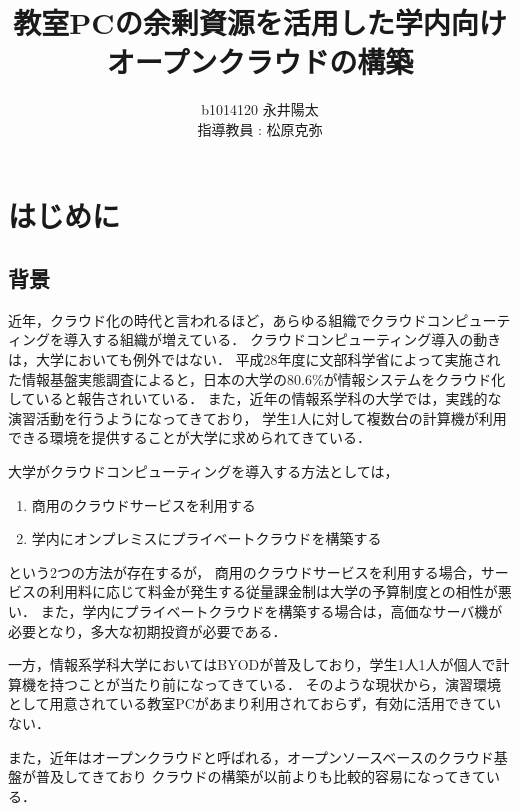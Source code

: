 \documentclass[11pt,a4paper]{jsarticle}
\author{%
b1014120 永井陽太\\指導教員 : 松原克弥
}
\title{教室PCの余剰資源を活用した学内向けオープンクラウドの構築}
\begin{document}
\maketitle

\section{はじめに}
\subsection{背景}
近年，クラウド化の時代と言われるほど，あらゆる組織でクラウドコンピューティングを導入する組織が増えている\cite{academiccloud}．
クラウドコンピューティング導入の動きは，大学においても例外ではない．
平成28年度に文部科学省によって実施された情報基盤実態調査によると，日本の大学の80.6\%が情報システムをクラウド化していると報告されいている\cite{SurveyOnActualStateOfAcademicInformationInfrastructure}．
また，近年の情報系学科の大学では，実践的な演習活動を行うようになってきており\cite{practicalict}，
学生1人に対して複数台の計算機が利用できる環境を提供することが大学に求められてきている．
\par 大学がクラウドコンピューティングを導入する方法としては，
\begin{enumerate}
	\item 商用のクラウドサービスを利用する
	\item 学内にオンプレミスにプライベートクラウドを構築する
\end{enumerate}
という2つの方法が存在するが，
商用のクラウドサービスを利用する場合，サービスの利用料に応じて料金が発生する従量課金制は大学の予算制度との相性が悪い．
また，学内にプライベートクラウドを構築する場合は，高価なサーバ機が必要となり，多大な初期投資が必要である．
\par 一方，情報系学科大学においてはBYODが普及しており，学生1人1人が個人で計算機を持つことが当たり前になってきている．
そのような現状から，演習環境として用意されている教室PCがあまり利用されておらず，有効に活用できていない．
\par また，近年はオープンクラウドと呼ばれる，オープンソースベースのクラウド基盤が普及してきており
クラウドの構築が以前よりも比較的容易になってきている．
\end{document}
